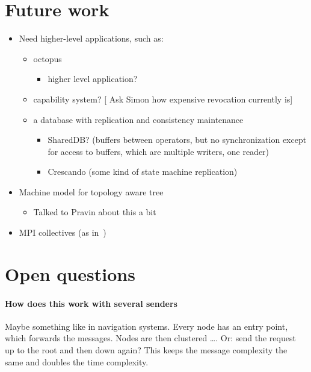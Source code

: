 \documentclass{article}
\newcommand{\stefan}[1]{
  {\color{skRed}[{\color{red}{SK}} #1]}}
\begin{document}
\section{Future work}

\begin{itemize}
\item Need higher-level applications, such as:
  \begin{itemize}
  \item octopus
    \begin{itemize}
    \item higher level application?
    \end{itemize}
  \item capability system? \stefan{Ask Simon how expensive revocation
      currently is}
  \item a database with replication and consistency maintenance
    \begin{itemize}
    \item SharedDB? (buffers between operators, but no synchronization
      except for access to buffers, which are multiple writers, one
      reader)
    \item Crescando (some kind of state machine replication)
    \end{itemize}
  \end{itemize}
\item Machine model for topology aware tree
  \begin{itemize}
  \item Talked to Pravin about this a bit
  \end{itemize}
\item MPI collectives (as in~\cite{Tu2008})
\end{itemize}

\section{Open questions}

\paragraph{How does this work with several senders} 
Maybe something like in navigation systems. Every node has an entry
point, which forwards the messages. Nodes are then clustered
\ldots. Or: send the request up to the root and then down again? This
keeps the message complexity the same and doubles the time
complexity. 

\newpage



\label{LastPage}
\end{document}
